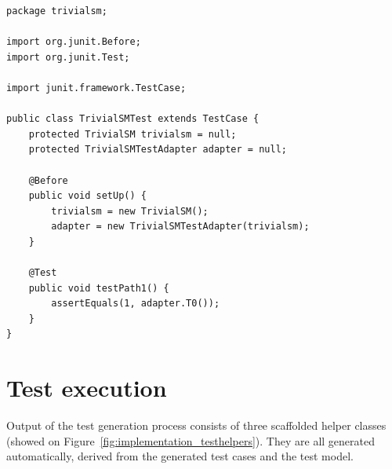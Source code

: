 \begin{lstlisting}[label={lst:testsuite}, caption=Generated JUnit test suite,breaklines=true]
package trivialsm;

import org.junit.Before;
import org.junit.Test;

import junit.framework.TestCase;

public class TrivialSMTest extends TestCase {
	protected TrivialSM trivialsm = null;
	protected TrivialSMTestAdapter adapter = null;
	   
	@Before 
	public void setUp() {
		trivialsm = new TrivialSM();
		adapter = new TrivialSMTestAdapter(trivialsm);
	}
	
	@Test
	public void testPath1() {
		assertEquals(1, adapter.T0());
	}
}
\end{lstlisting}


\section{Test execution}
\label{sec:testexecutionimplementation}

Output of the test generation process consists of three scaffolded helper classes (showed on Figure~\ref{fig:implementation_testhelpers}). They are all generated automatically, derived from the generated test cases and the test model.
	
